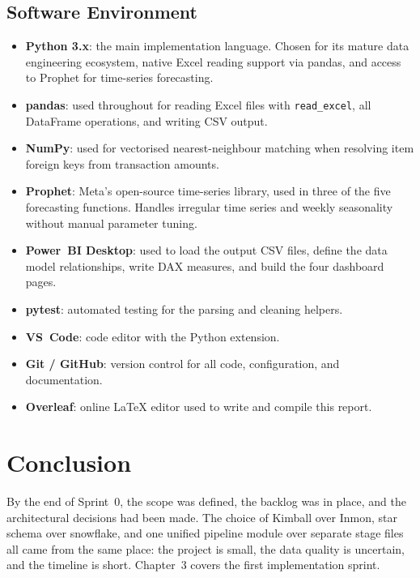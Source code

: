 \documentclass[12pt, a4paper]{report}
\begin{document}
\subsection{Software Environment}

\begin{itemize}
  \item \textbf{Python 3.x}: the main implementation language. Chosen for its
        mature data engineering ecosystem, native Excel reading support via pandas,
        and access to Prophet for time-series forecasting.

  \item \textbf{pandas}: used throughout for reading Excel files with
        \texttt{read\_excel}, all DataFrame operations, and writing CSV output.

  \item \textbf{NumPy}: used for vectorised nearest-neighbour matching when
        resolving item foreign keys from transaction amounts.

  \item \textbf{Prophet}: Meta's open-source time-series library, used in three
        of the five forecasting functions. Handles irregular time series and weekly
        seasonality without manual parameter tuning.

  \item \textbf{Power~BI Desktop}: used to load the output CSV files, define the
        data model relationships, write DAX measures, and build the four dashboard
        pages.

  \item \textbf{pytest}: automated testing for the parsing and cleaning helpers.

  \item \textbf{VS~Code}: code editor with the Python extension.

  \item \textbf{Git / GitHub}: version control for all code, configuration, and
        documentation.

  \item \textbf{Overleaf}: online \LaTeX{} editor used to write and compile this
        report.
\end{itemize}

\section{Conclusion}

By the end of Sprint~0, the scope was defined, the backlog was in place, and the
architectural decisions had been made. The choice of Kimball over Inmon, star schema
over snowflake, and one unified pipeline module over separate stage files all came
from the same place: the project is small, the data quality is uncertain, and the
timeline is short. Chapter~3 covers the first implementation sprint.
\end{document}
